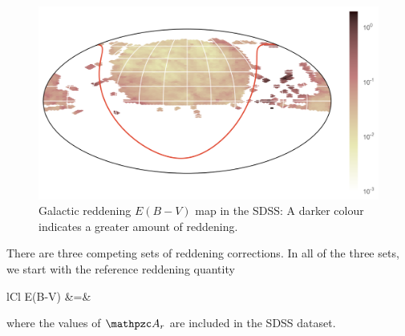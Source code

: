 \begin{figure}[tbp]
	\centering
	\includegraphics[width=\textwidth]{figures/2_astro/ebv_map}
	\caption[Galactic reddening map in the SDSS]{Galactic reddening $E(B-V)$ map in the SDSS:
		A darker colour indicates a greater amount of reddening.}
	\label{fig:reddening}
\end{figure}

There are three competing sets of reddening corrections. In all of the three sets, we
start with the reference reddening quantity
	\begin{IEEEeqnarray*}{lCl}
		E(B-V) &=& 
	\end{IEEEeqnarray*}
where the values of $\A_r$ are included in the SDSS dataset.

